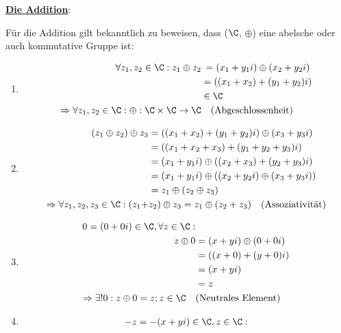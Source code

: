 \documentclass[main.tex]{subfiles}
\begin{document}
	\begin{Beweis}
		\underline{\textbf{Die Addition}}:

		Für die Addition gilt bekanntlich zu beweisen, dass ($\C$, $\oplus$) eine abelsche oder auch kommutative Gruppe ist:

		\begin{enumerate}
			\item \begin{align*}
						\forall z_1, z_2 \in \C: z_1 \oplus z_2 &\:= (x_1 + y_1i) \oplus (x_2 + y_2i) \\
														   		&= ((x_1 + x_2) + (y_1 + y_2)i) \\
														   		&\in \C \\
						\Rightarrow \forall z_1, z_2 \in \C: \oplus : \C \times \C \rightarrow \C & \quad \text{(Abgeschlossenheit)}
				  \end{align*}
			\item \begin{align*}
				  		(z_1 \oplus z_2) \oplus z_3 &= ((x_1 + x_2) + (y_1 + y_2)i) \oplus (x_3 + y_3i) \\
										  			&= ((x_1 + x_2 + x_3) + (y_1 + y_2 + y_3)i) \\
												    &= (x_1 + y_1i) \oplus ((x_2 + x_3) + (y_2 + y_3)i) \\
												    &= (x_1 + y_1i) \oplus ((x_2 + y_2i) \oplus (x_3 + y_3i)) \\
												    &= z_1 \oplus (z_2 \oplus z_3) \\
						\Rightarrow \forall z_1, z_2, z_3 \in \C: (z_1 + &z_2) \oplus  z_3 = z_1 \oplus (z_2 + z_3) \quad \text{(Assoziativität)}
				  \end{align*}
			\item \begin{align*}
						0 = (0 + 0i) \in \C, \forall z \in \C:& \\
												   z \oplus 0 &= (x + yi) \oplus (0 + 0i) \\
													  		  &= ((x + 0) + (y + 0)i) \\
															  &= (x + yi) \\
															  &= z \\
						\Rightarrow \exists! 0: z \oplus 0 = z; z \in \C \quad &\text{(Neutrales Element)}
				  \end{align*}
			\item \begin{align*}
	  					-z = -(x + yi) \in \C, z \in \C &: \\

\end{align*}
\end{enumerate}
\end{Beweis}
\end{document}
